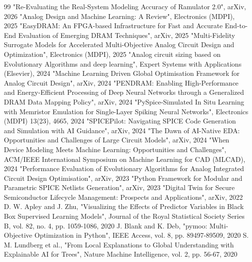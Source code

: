 \documentclass[conference]{IEEEtran}
\begin{document}
\begin{thebibliography}{99}
 "Re-Evaluating the Real-System Modeling Accuracy of Ramulator 2.0", arXiv, 2026
 "Analog Design and Machine Learning: A Review", Electronics (MDPI), 2025
 "EasyDRAM: An FPGA-based Infrastructure for Fast and Accurate End-to-End Evaluation of Emerging DRAM Techniques", arXiv, 2025
 "Multi-Fidelity Surrogate Models for Accelerated Multi-Objective Analog Circuit Design and Optimization", Electronics (MDPI), 2025
 "Analog circuit sizing based on Evolutionary Algorithms and deep learning", Expert Systems with Applications (Elsevier), 2024
 "Machine Learning Driven Global Optimisation Framework for Analog Circuit Design", arXiv, 2024
 "PENDRAM: Enabling High-Performance and Energy-Efficient Processing of Deep Neural Networks through a Generalized DRAM Data Mapping Policy", arXiv, 2024
 "PySpice-Simulated In Situ Learning with Memristor Emulation for Single-Layer Spiking Neural Networks", Electronics (MDPI) 13(23), 4665, 2024
 "SPICEPilot: Navigating SPICE Code Generation and Simulation with AI Guidance", arXiv, 2024
 "The Dawn of AI-Native EDA: Opportunities and Challenges of Large Circuit Models", arXiv, 2024
 "When Device Modeling Meets Machine Learning: Opportunities and Challenges", ACM/IEEE International Symposium on Machine Learning for CAD (MLCAD), 2024
 "Performance Evaluation of Evolutionary Algorithms for Analog Integrated Circuit Design Optimisation", arXiv, 2023
 "Python Framework for Modular and Parametric SPICE Netlists Generation", arXiv, 2023
 "Digital Twin for Secure Semiconductor Lifecycle Management: Prospects and Applications", arXiv, 2022
 D. W. Apley and J. Zhu, "Visualizing the Effects of Predictor Variables in Black Box Supervised Learning Models", Journal of the Royal Statistical Society Series B, vol. 82, no. 4, pp. 1059-1086, 2020
 J. Blank and K. Deb, "pymoo: Multi-Objective Optimization in Python", IEEE Access, vol. 8, pp. 89497-89509, 2020
 S. M. Lundberg et al., "From Local Explanations to Global Understanding with Explainable AI for Trees", Nature Machine Intelligence, vol. 2, pp. 56-67, 2020

\end{thebibliography}
\end{document}

